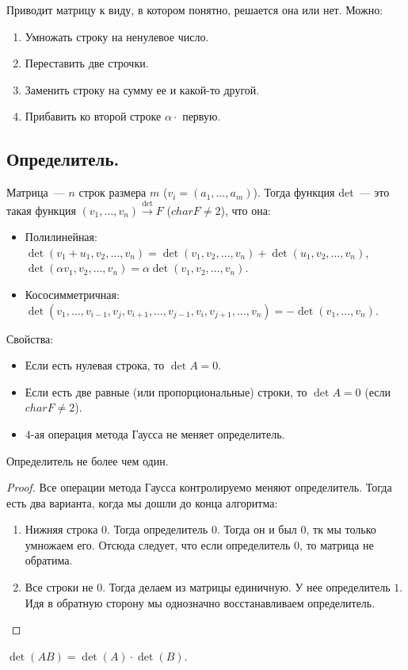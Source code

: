 \documentclass[12pt]{article}
\begin{document}
	\begin{method}[Гаусса]
		Приводит матрицу к виду, в котором понятно, решается она или нет. Можно:
		\begin{enumerate}
			\item Умножать строку на ненулевое число.
			\item Переставить две строчки.
			\item Заменить строку на сумму ее и какой-то другой.
			\item Прибавить ко второй строке $\alpha \cdot$ первую.
		\end{enumerate}
	\end{method}
	\subsection{Определитель.}
	\begin{definition}
		Матрица~--- $n$ строк размера $m$ ($v_i = (a_1, \dots, a_m)$). Тогда функция det~--- это такая функция $(v_1, \dots, v_n) \xrightarrow{\det} F$ ($char F \not= 2$), что она:
		\begin{itemize}
			\item Полилинейная: $\det(v_1 + u_1, v_2, \dots, v_n) = \det(v_1, v_2, \dots, v_n) + \det(u_1, v_2, \dots, v_n)$, $\det(\alpha v_1, v_2, \dots, v_n) = \alpha \det(v_1, v_2, \dots, v_n)$.
			\item Кососимметричная: $\det(v_1, \dots, v_{i - 1}, v_j, v_{i + 1}, \dots, v_{j - 1}, v_i, v_{j + 1}, \dots, v_n) = -\det(v_1, \dots, v_n)$.
		\end{itemize}
	\end{definition}
	\noindent
	Свойства:
	\begin{itemize}
		\item Если есть нулевая строка, то $\det A = 0$.
		\item Если есть две равные (или пропорциональные) строки, то $\det A = 0$ (если $char F \not= 2$).
		\item $4$-ая операция метода Гаусса не меняет определитель.
	\end{itemize}
	\begin{statement}
		Определитель не более чем один.
	\end{statement}
	\begin{proof}
		Все операции метода Гаусса контролируемо меняют определитель. Тогда есть два варианта, когда мы дошли до конца алгоритма:
		\begin{enumerate}
			\item Нижняя строка $0$. Тогда определитель $0$. Тогда он и был $0$, тк мы только умножаем его. Отсюда следует, что если определитель $0$, то матрица не обратима.
			\item Все строки не $0$. Тогда делаем из матрицы единичную. У нее определитель $1$. Идя в обратную сторону мы однозначно восстанавливаем определитель.
		\end{enumerate}
	\end{proof}
	\begin{statement}
		$\det(AB) = \det(A) \cdot \det(B)$.
	\end{statement}
\end{document}
